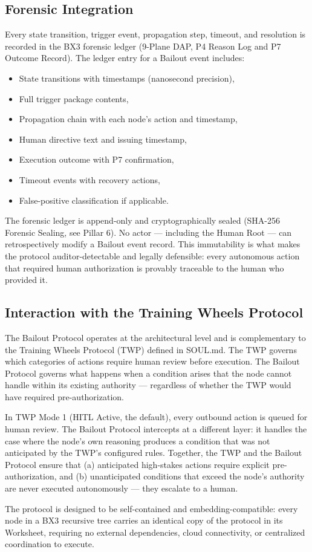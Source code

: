\subsection{Forensic Integration}

Every state transition, trigger event, propagation step, timeout, and resolution is recorded in the BX3 forensic ledger (9-Plane DAP, P4 Reason Log and P7 Outcome Record). The ledger entry for a Bailout event includes:

\begin{itemize}
    \item State transitions with timestamps (nanosecond precision),
    \item Full trigger package contents,
    \item Propagation chain with each node's action and timestamp,
    \item Human directive text and issuing timestamp,
    \item Execution outcome with P7 confirmation,
    \item Timeout events with recovery actions,
    \item False-positive classification if applicable.
\end{itemize}

The forensic ledger is append-only and cryptographically sealed (SHA-256 Forensic Sealing, see Pillar 6). No actor — including the Human Root — can retrospectively modify a Bailout event record. This immutability is what makes the protocol auditor-detectable and legally defensible: every autonomous action that required human authorization is provably traceable to the human who provided it.

\subsection{Interaction with the Training Wheels Protocol}

The Bailout Protocol operates at the architectural level and is complementary to the Training Wheels Protocol (TWP) defined in SOUL.md. The TWP governs which categories of actions require human review before execution. The Bailout Protocol governs what happens when a condition arises that the node cannot handle within its existing authority — regardless of whether the TWP would have required pre-authorization.

In TWP Mode 1 (HITL Active, the default), every outbound action is queued for human review. The Bailout Protocol intercepts at a different layer: it handles the case where the node's own reasoning produces a condition that was not anticipated by the TWP's configured rules. Together, the TWP and the Bailout Protocol ensure that (a) anticipated high-stakes actions require explicit pre-authorization, and (b) unanticipated conditions that exceed the node's authority are never executed autonomously — they escalate to a human.

The protocol is designed to be self-contained and embedding-compatible: every node in a BX3 recursive tree carries an identical copy of the protocol in its Worksheet, requiring no external dependencies, cloud connectivity, or centralized coordination to execute.